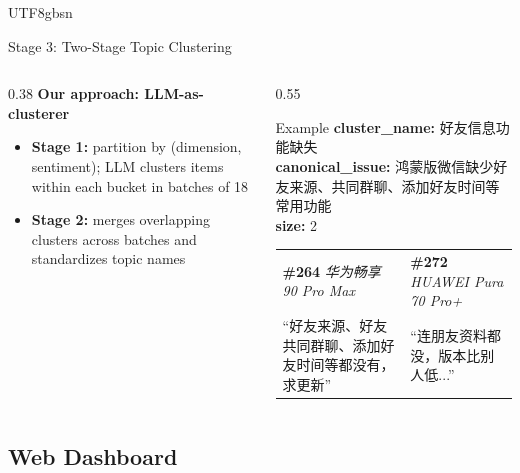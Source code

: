 \documentclass[11pt,aspectratio=169]{beamer}
\begin{document}
\begin{CJK*}{UTF8}{gbsn}
\begin{frame}{Stage 3: Two-Stage Topic Clustering}
\begin{columns}[T]
\begin{column}{0.38\textwidth}
      \vspace{0.1cm}
      \textbf{Our approach: LLM-as-clusterer}
      \begin{itemize}
        \setlength\itemsep{2pt}
        \item \textbf{Stage 1:} partition by (dimension, sentiment); LLM clusters items within each bucket in batches of 18
        \item \textbf{Stage 2:} merges overlapping clusters across batches and standardizes topic names      
        \end{itemize}
    \end{column}
    \begin{column}{0.55\textwidth}
      \begin{exampleblock}{Example}
        \scriptsize
        \textbf{cluster\_name:} 好友信息功能缺失\\
        \textbf{canonical\_issue:} 鸿蒙版微信缺少好友来源、共同群聊、添加好友时间等常用功能\\
        \textbf{size:} 2

        \vspace{0.1cm}
        \begin{tabular}{@{}p{}p{}@{}}
          \scriptsize \textbf{\#264} \quad \textit{华为畅享 90 Pro Max} &
          \scriptsize \textbf{\#272} \quad \textit{HUAWEI Pura 70 Pro+} \\[2pt]
          \scriptsize ``好友来源、好友共同群聊、添加好友时间等都没有，求更新'' &
          \scriptsize ``连朋友资料都没，版本比别人低...'' \\
        \end{tabular}
      \end{exampleblock}
    \end{column}
  \end{columns}
\end{frame}

\subsection{Web Dashboard}


\end{CJK*}
\end{document}
